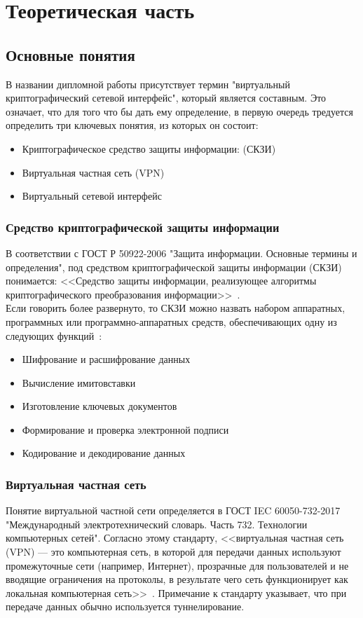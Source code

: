 \section{Теоретическая часть}

\subsection{Основные понятия}

В названии дипломной работы присутствует термин "виртуальный криптографический сетевой интерфейс", который является составным.
Это означает, что для того что бы дать ему определение, в первую очередь тредуется определить три ключевых понятия, из которых он состоит:
\begin{itemize}
    \item Криптографическое средство защиты информации: (СКЗИ)
    \item Виртуальная частная сеть (VPN)
    \item Виртуальный сетевой интерфейс
\end{itemize}

\subsubsection{Средство криптографической защиты информации}
В соответствии с ГОСТ Р 50922-2006 "Защита информации. Основные термины и определения", под средством криптографической защиты информации (СКЗИ) понимается: <<Средство защиты информации, реализующее алгоритмы криптографического преобразования информации>>~\cite[с. 4]{gost_50922_2006}.\\

Если говорить более развернуто, то СКЗИ можно назвать набором аппаратных, программных или программно-аппаратных средств, обеспечивающих одну из следующих функций~\cite[с. 1]{pp313}:
\begin{itemize}
    \item Шифрование и расшифрование данных
    \item Вычисление имитовставки
    \item Изготовление ключевых документов
    \item Формирование и проверка электронной подписи
    \item Кодирование и декодирование данных
\end{itemize}

\subsubsection{Виртуальная частная сеть}
Понятие виртуальной частной сети определяется в ГОСТ IEC 60050-732-2017 "Международный электротехнический словарь. Часть 732. Технологии компьютерных сетей".
Согласно этому стандарту, <<виртуальная частная сеть (VPN) — это компьютерная сеть, в которой для передачи данных используют промежуточные сети (например, Интернет), прозрачные для пользователей и не вводящие ограничения на протоколы, в результате чего сеть функционирует как локальная компьютерная сеть>>~\cite[с. 2]{gost_60050_732_2017}.
Примечание к стандарту указывает, что при передаче данных обычно используется туннелирование.\\

